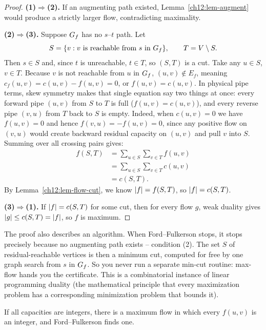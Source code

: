\begin{proof}
\textbf{(1)$\Rightarrow$(2).} If an augmenting path existed,
Lemma~\ref{ch12:lem-augment} would produce a strictly larger flow, contradicting
maximality.

\textbf{(2)$\Rightarrow$(3).} Suppose $G_f$ has no $s$--$t$ path. Let
\[
  S=\{v: v\text{ is reachable from }s\text{ in }G_f\},\qquad T=V\setminus S.
\]
Then $s\in S$ and, since $t$ is unreachable, $t\in T$, so $(S,T)$ is a cut. Take
any $u\in S$, $v\in T$. Because $v$ is not reachable from $u$ in $G_f$,
$(u,v)\notin E_f$, meaning $c_f(u,v)=c(u,v)-f(u,v)=0$, or $f(u,v)=c(u,v)$. In
physical pipe terms, skew symmetry makes that single equation say two things at
once: every forward pipe $(u,v)$ from $S$ to $T$ is full ($f(u,v)=c(u,v)$), and
every reverse pipe $(v,u)$ from $T$ back to $S$ is empty. Indeed, when
$c(u,v)=0$ we have $f(u,v)=0$ and hence $f(v,u)=-f(u,v)=0$, since any positive
flow on $(v,u)$ would create backward residual capacity on $(u,v)$ and pull $v$
into $S$. Summing over all crossing pairs gives:
\begin{align*}
  f(S,T) &= \sum_{u\in S}\sum_{v\in T} f(u,v) \\
  &= \sum_{u\in S}\sum_{v\in T} c(u,v) \\
  &= c(S,T).
\end{align*}
By Lemma~\ref{ch12:lem-flow-cut}, we know $\lvert f\rvert = f(S,T)$, so $\lvert f\rvert = c(S,T)$.

\textbf{(3)$\Rightarrow$(1).} If $\lvert f\rvert=c(S,T)$ for some cut, then for every flow
$g$, weak duality gives $\lvert g\rvert\le c(S,T)=\lvert f\rvert$, so $f$ is maximum.
\end{proof}

\begin{whybox}
The proof also describes an algorithm. When Ford--Fulkerson stops, it stops precisely because
no augmenting path exists -- condition (2). The set $S$ of residual-reachable
vertices is then a minimum cut, computed for free by one graph search from $s$ in
$G_f$. So you never run a separate min-cut routine: max-flow hands you the
certificate. This is a combinatorial instance of linear programming duality (the mathematical principle that every maximization problem has a corresponding minimization problem that bounds it).
\end{whybox}

\begin{corollary}
\label{ch12:cor-integral}
If all capacities are integers, there is a maximum flow in which every $f(u,v)$ is
an integer, and Ford--Fulkerson finds one.
\end{corollary}


